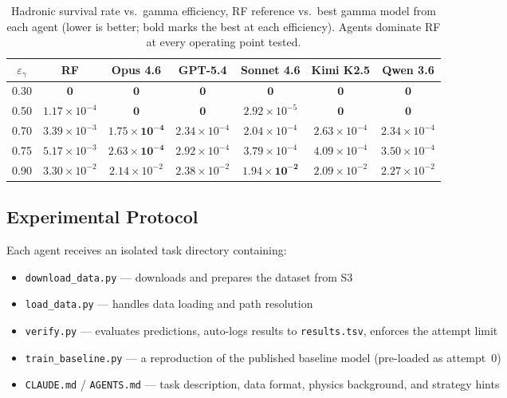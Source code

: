 \documentclass[universe,article,submit,pdftex,oneauthor]{Definitions/mdpi}
\begin{document}
\begin{table}[H]
\caption{Hadronic survival rate vs.\ gamma efficiency, RF reference vs.\ best gamma model from each agent (lower is better; bold marks the best at each efficiency). Agents dominate RF at every operating point tested.\label{tab:roc_comparison}}
\begin{tabularx}{\textwidth}{cCCCCCC}
\toprule
$\varepsilon_\gamma$ & RF & Opus 4.6 & GPT-5.4 & Sonnet 4.6 & Kimi K2.5 & Qwen 3.6 \\
 & $\mathbf{0}$         & $\mathbf{0}$         & $\mathbf{0}$         & $\mathbf{0}$         & $\mathbf{0}$         & $\mathbf{0}$         \\
0.50 & $1.17\!\times\!10^{-4}$ & $\mathbf{0}$         & $\mathbf{0}$         & $2.92\!\times\!10^{-5}$ & $\mathbf{0}$         & $\mathbf{0}$         \\
0.70 & $3.39\!\times\!10^{-3}$ & $\mathbf{1.75\!\times\!10^{-4}}$ & $2.34\!\times\!10^{-4}$ & $2.04\!\times\!10^{-4}$ & $2.63\!\times\!10^{-4}$ & $2.34\!\times\!10^{-4}$ \\
0.75 & $5.17\!\times\!10^{-3}$ & $\mathbf{2.63\!\times\!10^{-4}}$ & $2.92\!\times\!10^{-4}$ & $3.79\!\times\!10^{-4}$ & $4.09\!\times\!10^{-4}$ & $3.50\!\times\!10^{-4}$ \\
0.90 & $3.30\!\times\!10^{-2}$ & $2.14\!\times\!10^{-2}$ & $2.38\!\times\!10^{-2}$ & $\mathbf{1.94\!\times\!10^{-2}}$ & $2.09\!\times\!10^{-2}$ & $2.27\!\times\!10^{-2}$ \\
\bottomrule
\end{tabularx}
\end{table}


\subsection{Experimental Protocol}
\label{sec:method}

Each agent receives an isolated task directory containing:
\begin{itemize}
    \item \texttt{download\_data.py} --- downloads and prepares the dataset from S3
    \item \texttt{load\_data.py} --- handles data loading and path resolution
    \item \texttt{verify.py} --- evaluates predictions, auto-logs results to \texttt{results.tsv}, enforces the attempt limit
    \item \texttt{train\_baseline.py} --- a reproduction of the published baseline model (pre-loaded as attempt~0)
    \item \texttt{CLAUDE.md} / \texttt{AGENTS.md} --- task description, data format, physics background, and strategy hints
\end{itemize}
\end{document}
